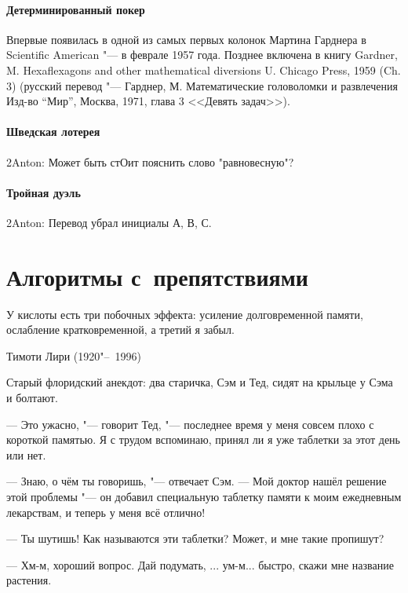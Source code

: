 \documentclass[twoside]{book}
\begin{document}
\subsubsection{Детерминированный покер}
Впервые появилась в одной из самых первых колонок Мартина Гарднера в Scientific American "--- в феврале 1957 года.
Позднее включена в книгу Gardner, M. Hexaflexagons and other mathematical diversions U. Chicago Press, 1959 (Ch. 3)
(русский перевод "--- Гарднер, М. Математические головоломки и развлечения Изд-во ``Мир'', Москва, 1971, глава 3 <<Девять задач>>).

\subsubsection{Шведская лотерея}
2Anton: Может быть стОит пояснить слово "равновесную"?

\subsubsection{Тройная дуэль}
2Anton: Перевод убрал инициалы А, В, С.



\chapter{Алгоритмы с~препятствиями}

\setlength{\epigraphwidth}{.6\textwidth}
\epigraph{У кислоты есть три побочных эффекта: усиление долговременной памяти, ослабление кратковременной, а третий я забыл.\vspace{1ex}}{Тимоти Лири (1920"--~1996)}

Старый флоридский анекдот:
два старичка, Сэм и Тед, сидят на крыльце у Сэма и болтают.

--- Это ужасно, "--- говорит Тед, "--- последнее время у меня совсем плохо с короткой памятью.
Я с трудом вспоминаю, принял ли я уже таблетки за этот день или нет.

--- Знаю, о чём ты говоришь, "--- отвечает Сэм.
--- Мой доктор нашёл решение этой проблемы "--- он добавил специальную таблетку памяти к моим ежедневным лекарствам, и теперь у меня всё отлично!

--- Ты шутишь! Как называются эти таблетки? Может, и мне такие пропишут?

--- Хм-м, хороший вопрос.
Дай подумать, ... ум-м... быстро, скажи мне название растения.
\end{document}
